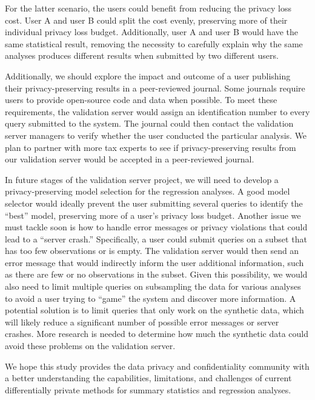 For the latter scenario, the users could benefit from reducing the privacy loss cost. User A and user B could split the cost evenly, preserving more of their individual privacy loss budget. Additionally, user A and user B would have the same statistical result, removing the necessity to carefully explain why the same analyses produces different results when submitted by two different users.

Additionally, we should explore the impact and outcome of a user publishing their privacy-preserving results in a peer-reviewed journal. Some journals require users to provide open-source code and data when possible. To meet these requirements, the validation server would assign an identification number to every query submitted to the system. The journal could then contact the validation server managers to verify whether the user conducted the particular analysis. We plan to partner with more tax experts to see if privacy-preserving results from our validation server would be accepted in a peer-reviewed journal.

In future stages of the validation server project, we will need to develop a privacy-preserving model selection for the regression analyses. A good model selector would ideally prevent the user submitting several queries to identify the ``best'' model, preserving more of a user's privacy loss budget. Another issue we must tackle soon is how to handle error messages or privacy violations that could lead to a ``server crash.'' Specifically, a user could submit queries on a subset that has too few observations or is empty. The validation server would then send an error message that would indirectly inform the user additional information, such as there are few or no observations in the subset. Given this possibility, we would also need to limit multiple queries on subsampling the data for various analyses to avoid a user trying to ``game'' the system and discover more information. A potential solution is to limit queries that only work on the synthetic data, which will likely reduce a significant number of possible error messages or server crashes. More research is needed to determine how much the synthetic data could avoid these problems on the validation server.

We hope this study provides the data privacy and confidentiality community with a better understanding the capabilities, limitations, and challenges of current differentially private methods for summary statistics and regression analyses. 